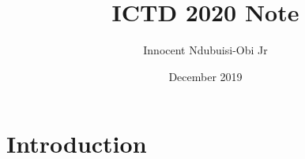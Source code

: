 \documentclass{article}
\title{ICTD 2020 Note}
\author{Innocent Ndubuisi-Obi Jr}
\date{December 2019}
\begin{document}
\maketitle

\section{Introduction}
\end{document}
